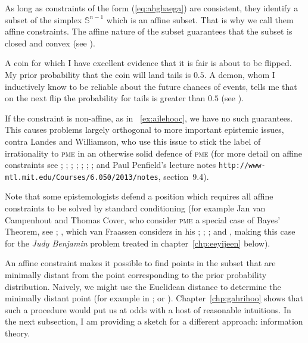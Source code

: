 \documentclass[phd,12pt,oneside]{ubcthesis}
\begin{document}
As long as constraints of the form (\ref{eq:ahghaega}) are consistent,
they identify a subset of the simplex $\mathbb{S}^{n-1}$ which is an
affine subset. That is why we call them affine constraints. The affine
nature of the subset guarantees that the subset is closed and convex
(see ). 

\begin{quotex}
  \label{ex:ailehooc} A coin for which I
  have excellent evidence that it is fair is about to be flipped. My
  prior probability that the coin will land tails is $0.5$. A demon,
  whom I inductively know to be reliable about the future chances of
  events, tells me that on the next flip the probability for tails is
  greater than $0.5$ (see ). 
\end{quotex}

If the constraint is non-affine, as in {\xample}~\ref{ex:ailehooc}, we
have no such guarantees. This causes problems largely orthogonal to
more important epistemic issues, contra Landes and Williamson, who use
this issue to stick the label of irrationality to \textsc{pme} in an
otherwise solid defence of \textsc{pme} (for more detail on affine
constraints see ; ;
; ;
; ;
; and Paul Penfield's lecture notes
\texttt{http://www-mtl.mit.edu/Courses/6.050/2013/notes},
section~9.4). 

Note that some epistemologists defend a position which requires all
affine constraints to be solved by standard conditioning (for example
Jan van Campenhout and Thomas Cover, who consider \textsc{pme} a
special case of Bayes' Theorem, see ;
, which van Fraassen considers  in his ;
; ; and
, making this case for the \emph{Judy
  Benjamin} problem treated in chapter~\ref{chp:eeyijeen} below).

An affine constraint makes it possible to find points in the subset
that are minimally distant from the point corresponding to the prior
probability distribution. Naively, we might use the Euclidean distance
to determine the minimally distant point (for example in
; or ).
Chapter~\ref{chp:gahrihoo} shows that such a procedure would put us at
odds with a host of reasonable intuitions. In the next subsection, I
am providing a sketch for a different approach: information theory.
\end{document}

